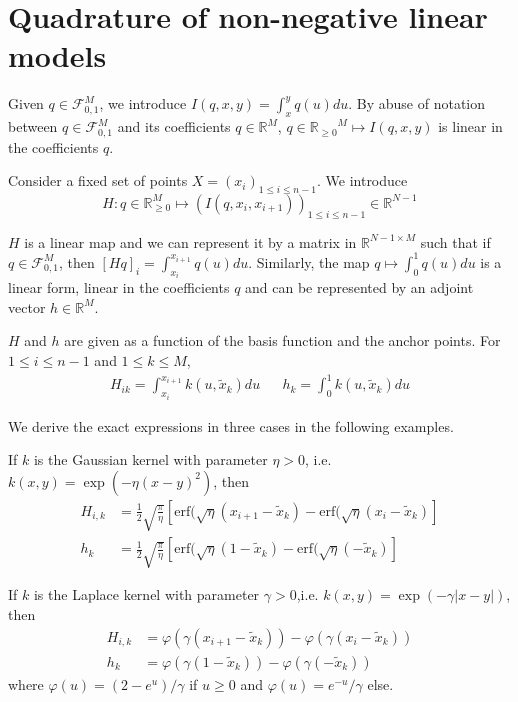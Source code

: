 \section{Quadrature of non-negative linear models}\label{app:diffytw-quadrature}

Given $q\in\mathcal F_{0,1}^M$, we introduce $I(q, x, y) = \int_x^y q(u)du$. By abuse of notation between $q\in\mathcal F_{0,1}^M$ and its coefficients $q\in\mathbb R^M$, $q\in{\mathbb R_{\geq 0}}^M \mapsto I(q, x, y)$ is linear in the coefficients $q$.

Consider a fixed set of points $X=(x_i)_{1\leq i\leq n-1}$. We introduce
\begin{equation}
H: q\in\mathbb R_{\geq 0}^M \mapsto (I(q, x_i, x_{i+1}))_{1\leq i\leq n-1}\in \mathbb R^{N-1}
\end{equation}

$H$ is a linear map and we can represent it by a matrix in $\mathbb R^{N-1 \times M}$ such that if $q\in \mathcal F_{0,1}^M$, then $[Hq]_{i} = \int_{x_i}^{x_{i+1}}q(u)du$. Similarly, the map $q \mapsto \int_0^1 q(u)du$ is a linear form, linear in the coefficients $q$ and can be represented by an adjoint vector $h\in\mathbb R^M$.

$H$ and $h$ are given as a function of the basis function and the anchor points. For $1 \leq i \leq n-1$ and $1\leq k\leq M$,
\begin{align}\label{eq:H}
    H_{ik}= \int_{x_i}^{x_{i+1}}k(u, \tilde x_k)du&& h_k = \int_0^1 k(u, \tilde x_k)du
\end{align}

We derive the exact expressions in three cases in the following examples.

\begin{example}\label{ex:H-rbf} If $k$ is the Gaussian kernel with parameter $\eta > 0$, i.e. $k(x, y) = \exp\left( - \eta (x - y)^2\right)$, then
\begin{align}
    H_{i,k} &= \frac{1}{2}\sqrt{\frac{\pi}{\eta}}\left[\mathrm{erf}(\sqrt{\eta}(x_{i+1}-\tilde x_k) - \mathrm{erf}(\sqrt{\eta}(x_i- \tilde x_k) \right]\\
    h_k &= \frac{1}{2}\sqrt{\frac{\pi}{\eta}}\left[\mathrm{erf}(\sqrt{\eta}(1-\tilde x_k) - \mathrm{erf}(\sqrt{\eta}(- \tilde x_k) \right]
\end{align}
\end{example}
\begin{example}\label{ex:H-laplace} If $k$ is the Laplace kernel with parameter $\gamma > 0$,i.e. $k(x, y) = \exp\left( - \gamma\vert x - y\vert\right)$, then
\begin{align}
    H_{i,k} &= \varphi(\gamma(x_{i+1} - \tilde x_k)) - \varphi(\gamma(x_i - \tilde x_k))\\
    h_{k} &= \varphi(\gamma(1- \tilde x_k)) - \varphi(\gamma(- \tilde x_k))
\end{align}
where $\varphi(u) = (2 - e^u)/\gamma$ if $u \geq 0$ and $\varphi(u) = e^{-u} / \gamma$ else.
\end{example}




